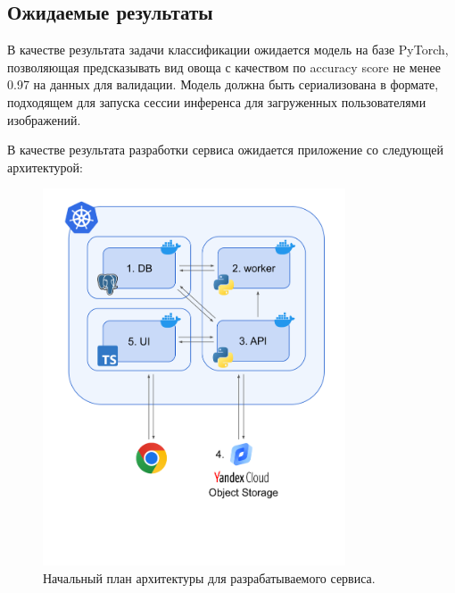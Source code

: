 \documentclass[a4paper,12pt]{extarticle}
\begin{document}
\subsection{Ожидаемые результаты}

В качестве результата задачи классификации ожидается модель на базе PyTorch, позволяющая
предсказывать вид овоща с качеством по accuracy score не менее 0.97 на данных для валидации. Модель
должна быть сериализована в формате, подходящем для запуска сессии инференса для загруженных
пользователями изображений.

В качестве результата разработки сервиса ожидается приложение со следующей архитектурой:

\begin{figure}[ht]
	\centering
	\includegraphics[width=0.8\textwidth,trim={0 2cm 0 0}]{expected_arch.png}
	\caption{Начальный план архитектуры для разрабатываемого сервиса.}
	\label{fig:expected_arch}
\end{figure}
\end{document}
